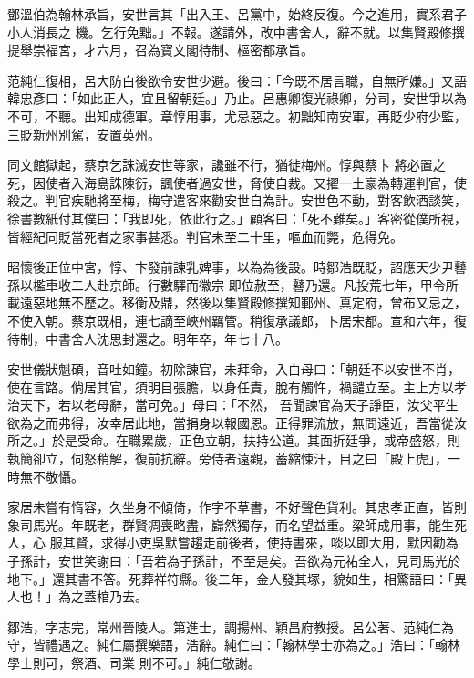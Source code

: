 \begin{pinyinscope}
 鄧溫伯為翰林承旨，安世言其「出入王、呂黨中，始終反復。今之進用，實系君子小人消長之
 機。乞行免黜。」不報。遂請外，改中書舍人，辭不就。以集賢殿修撰提舉崇福宮，才六月，召為寶文閣待制、樞密都承旨。



 范純仁復相，呂大防白後欲令安世少避。後曰：「今既不居言職，自無所嫌。」又語韓忠彥曰：「如此正人，宜且留朝廷。」乃止。呂惠卿復光祿卿，分司，安世爭以為不可，不聽。出知成德軍。章惇用事，尤忌惡之。初黜知南安軍，再貶少府少監，三貶新州別駕，安置英州。



 同文館獄起，蔡京乞誅滅安世等家，讒雖不行，猶徙梅州。惇與蔡卞
 將必置之死，因使者入海島誅陳衍，諷使者過安世，脅使自裁。又擢一土豪為轉運判官，使殺之。判官疾馳將至梅，梅守遣客來勸安世自為計。安世色不動，對客飲酒談笑，徐書數紙付其僕曰：「我即死，依此行之。」顧客曰：「死不難矣。」客密從僕所視，皆經紀同貶當死者之家事甚悉。判官未至二十里，嘔血而斃，危得免。



 昭懷後正位中宮，惇、卞發前諫乳婢事，以為為後設。時鄒浩既貶，詔應天少尹鼛孫以檻車收二人赴京師。行數驛而徽宗
 即位赦至，鼛乃還。凡投荒七年，甲令所載遠惡地無不歷之。移衡及鼎，然後以集賢殿修撰知鄆州、真定府，曾布又忌之，不使入朝。蔡京既相，連七謫至峽州羈管。稍復承議郎，卜居宋都。宣和六年，復待制，中書舍人沈思封還之。明年卒，年七十八。



 安世儀狀魁碩，音吐如鐘。初除諫官，未拜命，入白母曰：「朝廷不以安世不肖，使在言路。倘居其官，須明目張膽，以身任責，脫有觸忤，禍譴立至。主上方以孝治天下，若以老母辭，當可免。」母曰：「不然，
 吾聞諫官為天子諍臣，汝父平生欲為之而弗得，汝幸居此地，當捐身以報國恩。正得罪流放，無問遠近，吾當從汝所之。」於是受命。在職累歲，正色立朝，扶持公道。其面折廷爭，或帝盛怒，則執簡卻立，伺怒稍解，復前抗辭。旁侍者遠觀，蓄縮悚汗，目之曰「殿上虎」，一時無不敬懾。



 家居未嘗有惰容，久坐身不傾倚，作字不草書，不好聲色貨利。其忠孝正直，皆則象司馬光。年既老，群賢凋喪略盡，巋然獨存，而名望益重。梁師成用事，能生死人，心
 服其賢，求得小吏吳默嘗趨走前後者，使持書來，啖以即大用，默因勸為子孫計，安世笑謝曰：「吾若為子孫計，不至是矣。吾欲為元祐全人，見司馬光於地下。」還其書不答。死葬祥符縣。後二年，金人發其塚，貌如生，相驚語曰：「異人也！」為之蓋棺乃去。



 鄒浩，字志完，常州晉陵人。第進士，調揚州、穎昌府教授。呂公著、范純仁為守，皆禮遇之。純仁屬撰樂語，浩辭。純仁曰：「翰林學士亦為之。」浩曰：「翰林學士則可，祭酒、司業
 則不可。」純仁敬謝。




\end{pinyinscope}
